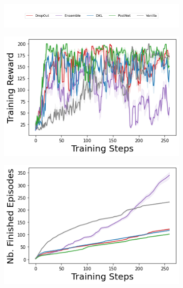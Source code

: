 \begin{figure}
    \centering
    \begin{subfigure}{.7\textwidth}
        \includegraphics[width=\textwidth]{sections/011_icml2022/resources/legend-standard.png}
    \end{subfigure}
    \vspace{-3mm}
    
    \begin{subfigure}{.3\textwidth}
        \includegraphics[width=\textwidth]{sections/011_icml2022/resources/cartpole-training_total_reward-training-model+.png}
    \end{subfigure}
    \begin{subfigure}{.3\textwidth}
        \includegraphics[width=\textwidth]{sections/011_icml2022/resources/cartpole-n_finished_training_episodes-training-model+.png}

\end{subfigure}
\end{figure}
